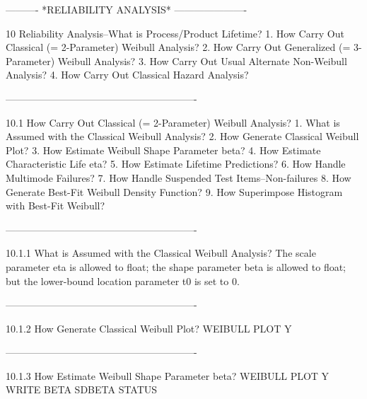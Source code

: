  
 
 
 
 
 
 
 
 
 
 
 
 
 
 
 
 
 
 
 
 
 
 
 
 
 
 
 
 
 
 
 
 
 
 
 
 
----------  *RELIABILITY ANALYSIS*  ----------------------
 
10
Reliability Analysis--What is Process/Product Lifetime?
   1. How Carry Out Classical   (= 2-Parameter) Weibull Analysis?
   2. How Carry Out Generalized (= 3-Parameter) Weibull Analysis?
   3. How Carry Out Usual Alternate Non-Weibull Analysis?
   4. How Carry Out Classical Hazard Analysis?
 
----------------------------------------------------------
 
10.1
How Carry Out Classical (= 2-Parameter) Weibull Analysis?
   1. What is Assumed with the Classical Weibull Analysis?
   2. How Generate Classical Weibull Plot?
   3. How Estimate Weibull Shape Parameter beta?
   4. How Estimate Characteristic Life eta?
   5. How Estimate Lifetime Predictions?
   6. How Handle Multimode Failures?
   7. How Handle Suspended Test Items--Non-failures
   8. How Generate Best-Fit Weibull Density Function?
   9. How Superimpose Histogram with Best-Fit Weibull?
 
----------------------------------------------------------
 
10.1.1
What is Assumed with the Classical Weibull Analysis?
      The scale parameter eta is allowed to float;
      the shape parameter beta is allowed to float;
      but the lower-bound location parameter t0 is set to 0.
 
----------------------------------------------------------
 
10.1.2
How Generate Classical Weibull Plot?
      WEIBULL PLOT Y
 
----------------------------------------------------------
 
10.1.3
How Estimate Weibull Shape Parameter beta?
      WEIBULL PLOT Y
      WRITE BETA SDBETA
      STATUS
 
